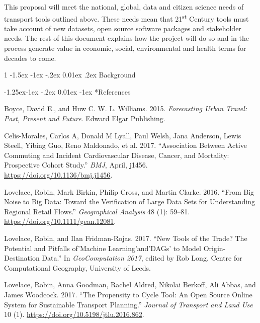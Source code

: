\documentclass[11pt]{article}
\makeatletter
\renewcommand\section{%
  \@startsection {section} %
  {1} %
  {\z@} %
  {-1.5ex \@plus -1ex \@minus -.2ex} %
  {0.01ex \@plus.2ex} %
  {\normalfont\large\bfseries} %
}
\renewcommand\subsection{%
  \@startsection{subsection}{2}{\z@}%
  {-1.25ex\@plus -1ex \@minus -.2ex}%
  {0.01ex \@plus -1ex}%
  {\normalfont\small\bfseries} %
}
\makeatother
\begin{document}
This proposal will meet the national, global, data and citizen science
needs of transport tools outlined above. These needs mean that
21\textsuperscript{st} Century tools must take account of new datasets,
open source software packages and stakeholder needs. The rest of this
document explains how the project will do so and in the process generate
value in economic, social, environmental and health terms for decades to
come.

\hypertarget{background}{%
\section{Background}\label{background}}

\hypertarget{references}{%
\subsection*{References}\label{references}}

\hypertarget{refs}{}
\leavevmode\hypertarget{ref-boyce_forecasting_2015}{}%
Boyce, David E., and Huw C. W. L. Williams. 2015. \emph{Forecasting
Urban Travel: Past, Present and Future}. Edward Elgar Publishing.

\leavevmode\hypertarget{ref-celis-morales_association_2017}{}%
Celis-Morales, Carlos A, Donald M Lyall, Paul Welsh, Jana Anderson,
Lewis Steell, Yibing Guo, Reno Maldonado, et al. 2017. ``Association
Between Active Commuting and Incident Cardiovascular Disease, Cancer,
and Mortality: Prospective Cohort Study.'' \emph{BMJ}, April, j1456.
\url{https://doi.org/10.1136/bmj.j1456}.

\leavevmode\hypertarget{ref-lovelace_big_2016}{}%
Lovelace, Robin, Mark Birkin, Philip Cross, and Martin Clarke. 2016.
``From Big Noise to Big Data: Toward the Verification of Large Data Sets
for Understanding Regional Retail Flows.'' \emph{Geographical Analysis}
48 (1): 59--81. \url{https://doi.org/10.1111/gean.12081}.

\leavevmode\hypertarget{ref-lovelace_new_2017}{}%
Lovelace, Robin, and Ilan Fridman-Rojas. 2017. ``New Tools of the Trade?
The Potential and Pitfalls of'Machine Learning'and'DAGs' to Model
Origin-Destination Data.'' In \emph{GeoComputation 2017}, edited by Rob
Long. Centre for Computational Geography, University of Leeds.

\leavevmode\hypertarget{ref-lovelace_propensity_2017}{}%
Lovelace, Robin, Anna Goodman, Rachel Aldred, Nikolai Berkoff, Ali
Abbas, and James Woodcock. 2017. ``The Propensity to Cycle Tool: An Open
Source Online System for Sustainable Transport Planning.'' \emph{Journal
of Transport and Land Use} 10 (1).
\url{https://doi.org/10.5198/jtlu.2016.862}.
\end{document}
